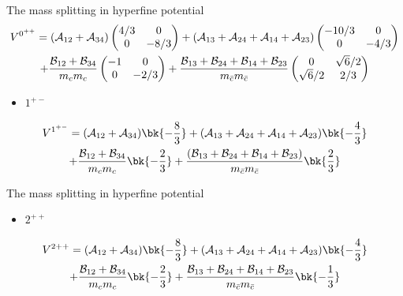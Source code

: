 \begin{frame}{The mass splitting in hyperfine potential}
    \begin{multline}
        V^{0^{++}} =
        (\mathcal{A}_{12}+\mathcal{A}_{34})\begin{pmatrix}
            4/3 & 0    \\
            0   & -8/3
        \end{pmatrix}
        + (\mathcal{A}_{13}+\mathcal{A}_{24}+\mathcal{A}_{14}+\mathcal{A}_{23})
        \begin{pmatrix}
            -10/3 & 0    \\
            0     & -4/3
        \end{pmatrix}\\
        +\frac{\mathcal{B}_{12}+\mathcal{B}_{34}}{m_{c}m_{c}}
        \begin{pmatrix}
            -1 & 0    \\
            0  & -2/3
        \end{pmatrix}
        +\frac{\mathcal{B}_{13}+\mathcal{B}_{24}+\mathcal{B}_{14}+\mathcal{B}_{23}}{m_{\bar{c}}m_{\bar{c}}}
        \begin{pmatrix}
            0          & \sqrt{6}/2 \\
            \sqrt{6}/2 & 2/3
        \end{pmatrix}
    \end{multline}
    \begin{itemize}
        \item $1^{+-}$
    \end{itemize}
    \begin{multline}
        V^{1^{+-}} = (\Acal_{12}+\Acal_{34})\bk{-\frac{8}{3}} + (\Acal_{13}+\Acal_{24}+\Acal_{14}+\Acal_{23})\bk{-\frac{4}{3}}\\
        +\frac{\Bcal_{12}+\Bcal_{34}}{m_{c}m_{c}}\bk{-\frac{2}{3}} +\frac{ (\Bcal_{13}+\Bcal_{24}+\Bcal_{14}+\Bcal_{23})}{m_{\bar{c}}m_{\bar{c}}}\bk{\frac{2}{3}}
    \end{multline}
\end{frame}
\begin{frame}{The mass splitting in hyperfine potential}
    \begin{itemize}
        \item $2^{++}$
    \end{itemize}
    \begin{multline}
        V^{2++} = (\Acal_{12}+\Acal_{34})\bk{-\frac{8}{3}} + (\Acal_{13}+\Acal_{24}+\Acal_{14}+\Acal_{23})\bk{-\frac{4}{3}}\\
        +\frac{\Bcal_{12}+\Bcal_{34}}{m_{c}m_{c}}\bk{-\frac{2}{3}} + \frac{\Bcal_{13}+\Bcal_{24}+\Bcal_{14}+\Bcal_{23}}{m_{\bar{c}}m_{\bar{c}}}\bk{-\frac{1}{3}}
    \end{multline}
\end{frame}
